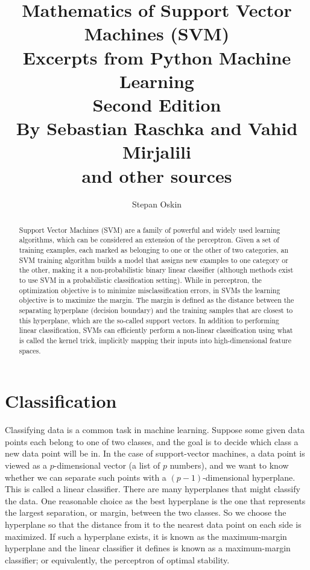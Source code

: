 \documentclass[11pt]{article}
\begin{document}
    \title{Mathematics of Support Vector Machines (SVM) \\
    Excerpts from Python Machine Learning \\
    Second Edition \\
    By Sebastian Raschka and Vahid Mirjalili \\
    and other sources}

    \author{Stepan Oskin}

    \maketitle

    \begin{abstract}

        Support Vector Machines (SVM) are a family of powerful and widely used learning algorithms,
        which can be considered an extension of the perceptron.
        Given a set of training examples, each marked as belonging to one or the other of two categories,
        an SVM training algorithm builds a model that assigns new examples to one category or the other,
        making it a non-probabilistic binary linear classifier (although methods exist to use SVM in
        a probabilistic classification setting).
        While in perceptron, the optimization objective is to minimize misclassification errors,
        in SVMs the learning objective is to maximize the margin.
        The margin is defined as the distance between the separating hyperplane (decision boundary)
        and the training samples that are closest to this hyperplane, which are the so-called support vectors.
        In addition to performing linear classification, SVMs can efficiently perform a non-linear classification
        using what is called the kernel trick, implicitly mapping their inputs into high-dimensional feature spaces.

    \end{abstract}

    \section{Classification} \label{sec:classification}

    Classifying data is a common task in machine learning.
    Suppose some given data points each belong to one of two classes, and the goal is to decide which class a
    new data point will be in.
    In the case of support-vector machines, a data point is viewed as a $p$-dimensional vector
    (a list of $p$ numbers), and we want to know whether we can separate such points with
    a $(p-1)$-dimensional hyperplane.
    This is called a linear classifier.
    There are many hyperplanes that might classify the data.
    One reasonable choice as the best hyperplane is the one that represents the largest separation, or margin,
    between the two classes.
    So we choose the hyperplane so that the distance from it to the nearest data point on each side is maximized.
    If such a hyperplane exists, it is known as the maximum-margin hyperplane and the linear classifier it defines
    is known as a maximum-margin classifier;
    or equivalently, the perceptron of optimal stability.
\end{document}

